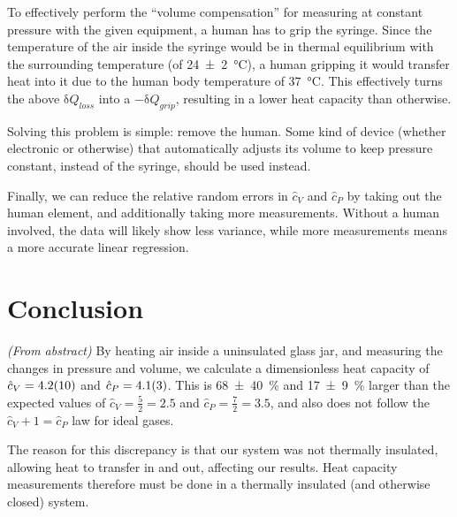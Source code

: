 \documentclass[a4paper]{scrartcl}
\begin{document}
To effectively perform the ``volume compensation'' for measuring at constant pressure with the given equipment, a human has to grip the syringe. Since the temperature of the air inside the syringe would be in thermal equilibrium with the surrounding temperature (of \SI{24 \pm 2}{\degreeCelsius}), a human gripping it would transfer heat into it due to the human body temperature of \SI{37}{\degreeCelsius}. This effectively turns the above \(\mathrm{\delta} Q_{loss}\) into a \(-\mathrm{\delta} Q_{grip}\), resulting in a lower heat capacity than otherwise.

Solving this problem is simple: remove the human. Some kind of device (whether electronic or otherwise) that automatically adjusts its volume to keep pressure constant, instead of the syringe, should be used instead.

Finally, we can reduce the relative random errors in \(\hat{c}_V\) and \(\hat{c}_P\) by taking out the human element, and additionally taking more measurements. Without a human involved, the data will likely show less variance, while more measurements means a more accurate linear regression.

\section{Conclusion}
\emph{(From abstract)} By heating air inside a uninsulated glass jar, and measuring the changes in pressure and volume, we calculate a dimensionless heat capacity of \(\hat{c}_V = \SI{4.2 \pm 1.0}{}\) and \(\hat{c}_P = \SI{4.1 \pm 0.3}{}\). This is \SI{68 \pm 40}{\percent} and \SI{17 \pm 9}{\percent} larger than the expected values of \(\hat{c}_V = \frac{5}{2} = 2.5\) and \(\hat{c}_P = \frac{7}{2} = 3.5\), and also does not follow the \(\hat{c}_V + 1 = \hat{c}_P\) law for ideal gases.

The reason for this discrepancy is that our system was not thermally insulated, allowing heat to transfer in and out, affecting our results. Heat capacity measurements therefore must be done in a thermally insulated (and otherwise closed) system.

\printbibliography
\end{document}
